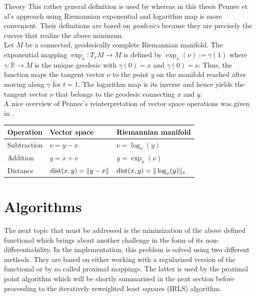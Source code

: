 \begin{chapter}{Theory}
This rather general definition is used by \cite{Absil2009} whereas in this thesis Pennec et al's \cite{Arsigny} approach using Riemannian exponential and logarithm map is more convenient. Their definitions are based on
\emph{geodesics} because they are precisely the curves that realize the above minimum.\\

Let $M$ be a connected, geodesically complete Riemannian manifold. The exponential mapping $\exp_x:T_xM\to M$ is defined by $\exp_x(\nu):=\gamma(1)$
where $\gamma:\mathbb{R}\to M$ is the unique geodesic with $\gamma(0)=x$ and $\dot{\gamma}(0)=\nu$.
Thus, the function maps the tangent vector $\nu$ to the point $y$ on the manifold reached after moving along $\gamma$ for $t=1$.
The logarithm map is its inverse and hence yields the tangent vector $\nu$ that belongs to the geodesic connecting $x$ and $y$. \\

A nice overview of Pennec's reinterpretation of vector space operations was given in \cite{mara}.

\begin{table}[h!]
\centering
\begin{tabular}{|l|l|l|}
\hline
Operation   & Vector space &	Riemannian manifold \\
\hline
Subtraction & $\nu=y-x$	& $\nu=\log_x(y)$	\\
Addition    & $y=x+v$	& $y=\exp_x(\nu)$	\\
Distance    & $\operatorname{dist}(x,y)=\| y-x \|$	& $ \operatorname{dist}(x,y)=\| \log_x(y) \|_x$ \\
\hline
\end{tabular}
\end{table}

\section{Algorithms} %
\label{sec:Algorithms}
The next topic that must be addressed is the minimization of the above defined functional which brings about another challenge in the form of its non-differentiability.
In the implementation, this problem is solved using two different methods. They are based on either working with a regularized version of the functional or by so called
proximal mappings. The latter is used by the proximal point algorithm which will be shortly summarized in the next section before proceeding to
the iteratively reweighted least squares (IRLS) algorithm.



\end{chapter}
